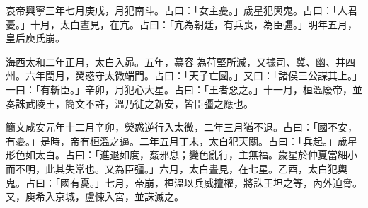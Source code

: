 \begin{pinyinscope}
 哀帝興寧三年七月庚戌，月犯南斗。占曰：「女主憂。」歲星犯輿鬼。占曰：「人君憂。」十月，太白晝見，在亢。占曰：「亢為朝廷，有兵喪，為臣彊。」明年五月，皇后庾氏崩。



 海西太和二年正月，太白入昴。五年，慕容為苻堅所滅，又據司、冀、幽、并四州。六年閏月，熒惑守太微端門。占曰：「天子亡國。」又曰：「諸侯三公謀其上。」一曰：「有斬臣。」辛卯，月犯心大星。占曰：「王者惡之。」十一月，桓溫廢帝，並奏誅武陵王，簡文不許，溫乃徙之新安，皆臣彊之應也。



 簡文咸安元年十二月辛卯，熒惑逆行入太微，二年三月猶不退。占曰：「國不安，有憂。」是時，帝有桓溫之逼。二年五月丁未，太白犯天關。占曰：「兵起。」歲星形色如太白。占曰：「進退如度，姦邪息；變色亂行，主無福。歲星於仲夏當細小而不明，此其失常也。又為臣彊。」六月，太白晝見，在七星。乙酉，太白犯輿鬼。占曰：「國有憂。」七月，帝崩，桓溫以兵威擅權，將誅王坦之等，內外迫脅。又，庾希入京城，盧悚入宮，並誅滅之。




\end{pinyinscope}
